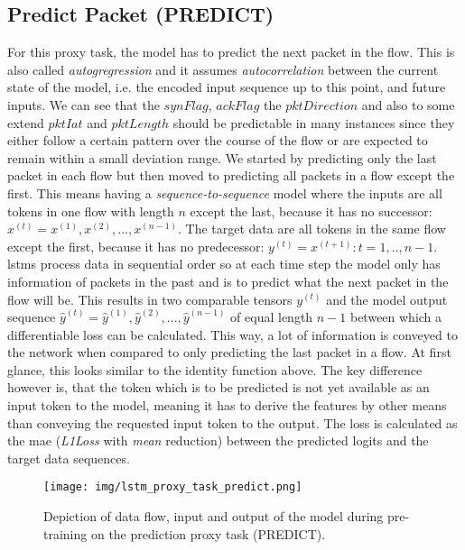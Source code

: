 \subsection{Predict Packet (PREDICT)} \label{sec:experiments:lstm:predict_packet}

For this proxy task, the model has to predict the next packet in the flow. This is also called \textit{autogregression} and it assumes \textit{autocorrelation} between the current state of the model, i.e. the encoded input sequence up to this point, and future inputs. We can see that the $synFlag$, $ackFlag$ the $pktDirection$ and also to some extend $pktIat$ and $pktLength$ should be predictable in many instances since they either follow a certain pattern over the course of the flow or are expected to remain within a small deviation range. We started by predicting only the last packet in each flow but then moved to predicting all packets in a flow except the first. This means having a \textit{sequence-to-sequence} model where the inputs are all tokens in one flow with length $n$ except the last, because it has no successor: $x^{(t)} = x^{(1)}, x^{(2)}, ..., x^{(n-1)}$. The target data are all tokens in the same flow except the first, because it has no predecessor: $y^{(t)} = x^{(t+1)} : t = 1,..,n-1$. \glspl{lstm} process data in sequential order so at each time step the model only has information of packets in the past and is to predict what the next packet in the flow will be. This results in two comparable tensors $y^{(t)}$ and the model output sequence $\hat{y}^{(t)} = \hat{y}^{(1)}, \hat{y}^{(2)}, ..., \hat{y}^{(n-1)}$ of equal length $n-1$ between which a differentiable loss can be calculated. This way, a lot of information is conveyed to the network when compared to only predicting the last packet in a flow. At first glance, this looks similar to the identity function above. The key difference however is, that the token which is to be predicted is not yet available as an input token to the model, meaning it has to derive the features by other means than conveying the requested input token to the output. The loss is calculated as the \gls{mae} (\textit{L1Loss} with \textit{mean} reduction) between the predicted logits and the target data sequences. 

\begin{figure}[]
	\centering
	\texttt{[image: img/lstm\_proxy\_task\_predict.png]}
	\caption{Depiction of data flow, input and output of the model during pre-training on the prediction proxy task (PREDICT). }
	\label{fig:experiments:lstm_proxy_task_predict}
\end{figure}

